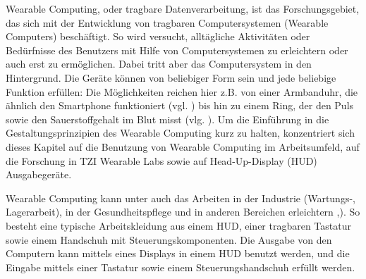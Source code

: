 Wearable Computing, oder tragbare Datenverarbeitung, ist das Forschungsgebiet, das sich mit der Entwicklung von tragbaren Computersystemen (Wearable Computers) beschäftigt\cite{wikiWearable}. So wird versucht, alltägliche Aktivitäten oder Bedürfnisse des Benutzers  mit Hilfe von Computersystemen zu erleichtern oder auch erst zu ermöglichen. Dabei tritt aber das Computersystem in den Hintergrund. Die Geräte können von beliebiger Form sein und jede beliebige Funktion erfüllen: Die Möglichkeiten reichen hier z.B. von einer Armbanduhr, die ähnlich den Smartphone funktioniert (vgl. \cite{zeitPc}) bis hin zu  einem  Ring, der den Puls sowie den Sauerstoffgehalt im Blut misst (vlg. \cite{urhWearable}).  Um die Einführung in die Gestaltungsprinzipien des Wearable Computing kurz zu halten, konzentriert sich dieses Kapitel auf die Benutzung von Wearable Computing im Arbeitsumfeld, auf die Forschung in TZI Wearable Labs sowie auf Head-Up-Display (HUD) Ausgabegeräte.

Wearable Computing kann unter auch das Arbeiten in der Industrie (Wartungs-, Lagerarbeit), in der Gesundheitspflege und in anderen Bereichen erleichtern \cite{Witt:2006hi},\cite{Lawo:2008gg}). So besteht eine typische Arbeitskleidung aus einem HUD, einer tragbaren Tastatur sowie einem Handschuh mit Steuerungskomponenten. Die Ausgabe von den Computern kann mittels eines Displays in einem HUD benutzt werden, und die Eingabe mittels einer Tastatur sowie einem Steuerungshandschuh erfüllt werden. 

